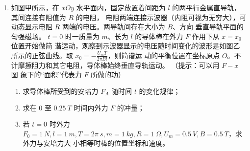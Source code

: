 \begin{enumerate}
\newpage
\item
如图甲所示，在 $ xOy $ 水平面内，固定放置着间距为 $ l $ 的两平行金属直导轨，其间连接有阻值为 $ R $ 的电阻，
电阻两端连接示波器（内阻可视为无穷大），可动态显示电阻 $ R $ 两端的电压。两导轨间存在大小为 $ B $、方向
垂直导轨平面的匀强磁场。 $ t=0 $ 时一质量为 $ m $、长为 $ l $ 的导体棒在外力 $ F $ 作用下从 $ x=x_{0} $位置开始做简
谐运动，观察到示波器显示的电压随时间变化的波形是如图乙所示的正弦曲线。取 $x_{0}=-\frac{U_{m} T}{2 \pi B l}$，则简谐运
动的平衡位置在坐标原点 $ O $。不计摩擦阻力和其它电阻，导体棒始终垂直导轨运动。
（提示：可以用 $ F-x $ 图
象下的“面积”代表力 $ F $ 所做的功）
\begin{enumerate}
\item
求导体棒所受到的安培力 $ F_{A} $ 随时间 $ t $ 的变化规律；
\item 
求在 $ 0 $ 至 $ 0.25 \ T $ 时间内外力 $ F $ 的冲量；
\item 
若 $ t=0 $ 时外力 $ F_0=1 \ N,l=1 \ m,T=2 \pi \ s,m=1 \ kg,R=1 \ \Omega ,U_{m}=0.5 \ V ,B=0.5 \ T $，求外力与安培力大
小相等时棒的位置坐标和速度。

\end{enumerate}
\begin{figure}[h!]
\flushright 
\begin{subfigure}{0.4\linewidth}
\centering
 
\caption{}\label{}
\end{subfigure}
\begin{subfigure}{0.4\linewidth}
\centering
 
\caption{}\label{}
\end{subfigure}	
\end{figure}



\end{enumerate}
